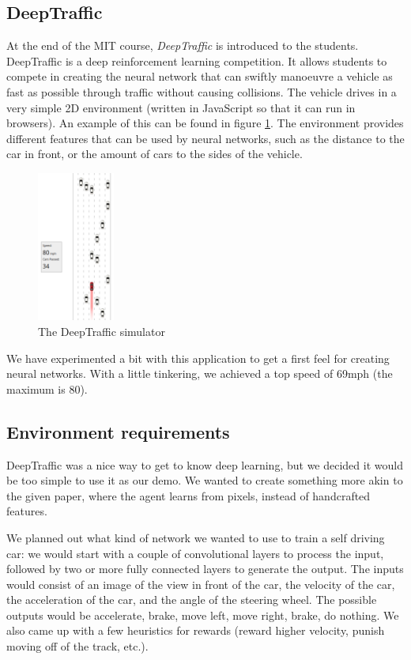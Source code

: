 \documentclass[12pt, conference, compsoc]{IEEEtran}
\begin{document}
\subsection{DeepTraffic}
At the end of the MIT course, \emph{DeepTraffic} is introduced to the students. DeepTraffic is a deep reinforcement learning competition. It allows students to compete in creating the neural network that can swiftly manoeuvre a vehicle as fast as possible through traffic without causing collisions. The vehicle drives in a very simple 2D environment (written in JavaScript so that it can run in browsers). An example of this can be found in figure \ref{fig:deep-traffic}. The environment provides different features that can be used by neural networks, such as the distance to the car in front, or the amount of cars to the sides of the vehicle.

\begin{figure}[!t]
\centering
\includegraphics[width=1in]{DeepTraffic.png}
\caption{The DeepTraffic simulator\cite{MIT:deeptraffic}}
\label{fig:deep-traffic}
\end{figure}

We have experimented a bit with this application to get a first feel for creating neural networks. With a little tinkering, we achieved a top speed of 69mph (the maximum is 80).

\subsection{Environment requirements}
DeepTraffic was a nice way to get to know deep learning, but we decided it would be too simple to use it as our demo. We wanted to create something more akin to the given paper, where the agent learns from pixels, instead of handcrafted features.

We planned out what kind of network we wanted to use to train a self driving car: we would start with a couple of convolutional layers to process the input, followed by two or more fully connected layers to generate the output. The inputs would consist of an image of the view in front of the car, the velocity of the car, the acceleration of the car, and the angle of the steering wheel. The possible outputs would be accelerate, brake, move left, move right, brake, do nothing. We also came up with a few heuristics for rewards (reward higher velocity, punish moving off of the track, etc.).
\end{document}
